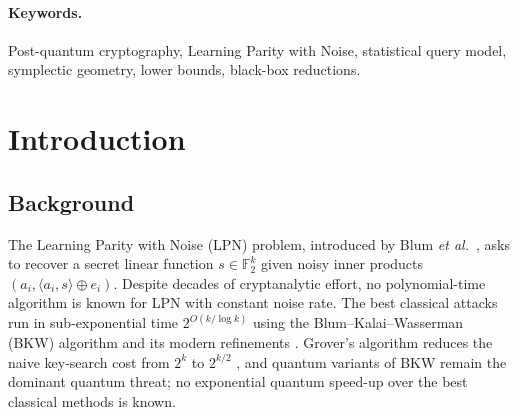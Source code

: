 \documentclass[11pt,a4paper]{article}
\theoremstyle{plain}
\theoremstyle{definition}
\newcommand{\F}{\mathbb{F}}
\newcommand{\etal}{\textit{et al.}}
\begin{document}
\begin{abstract}
For reductions, we introduce a \emph{transport} invariant $C^{\top}MC=0$ inherited from the secret's isotropy and combine it with an entropy-support counting bound to close three of the four cells of the linear-reduction landscape (public-matrix, fixed, conditionally-uniform adaptive) unconditionally, and the deterministic half of the fourth, leaving a single precisely-stated open cell (randomized marginal-adaptive). This is independent of, and complementary to, the concurrent decoding-formulation barriers of Lu \etal: our transport invariant and exact-moment analysis do not use their entropy argument. Our statistical-query and information-theoretic analysis works in the membership formulation --- its natural form --- while the linear-reduction landscape and the hardness floor above concern the computational sympLPN formulation; we separate the membership, batch, and sympLPN formulations by information-theoretic floors. While the LSN problem belongs to the recently proposed stabilizer-decoding / symplectic-LPN family rather than constituting a new hardness family of its own, the contributions developed here---the first exact, asymptotic-error-free statistical analysis of this problem class and a near-complete linear-reduction landscape---are new; every claim is a proved theorem, an explicitly labeled piece of empirical evidence, or an explicitly labeled conjecture.
\end{abstract}

\paragraph{\textbf{Keywords.}} Post-quantum cryptography, Learning Parity with Noise, statistical query model, symplectic geometry, lower bounds, black-box reductions.

\section{Introduction}
\label{sec:intro}

\subsection{Background}
\label{subsec:background}

The Learning Parity with Noise (LPN) problem, introduced by Blum \etal\ \cite{BFKL94}, asks to recover a secret linear function $s \in \F_2^k$ given noisy inner products $(a_i, \langle a_i, s \rangle \oplus e_i)$. Despite decades of cryptanalytic effort, no polynomial-time algorithm is known for LPN with constant noise rate. The best classical attacks run in sub-exponential time $2^{O(k / \log k)}$ using the Blum--Kalai--Wasserman (BKW) algorithm \cite{BKW03} and its modern refinements \cite{LF06,Lyu05,EKM17,GJL14,Kir11}. Grover's algorithm reduces the naive key-search cost from $2^k$ to $2^{k/2}$ \cite{Gro96}, and quantum variants of BKW remain the dominant quantum threat; no exponential quantum speed-up over the best classical methods is known.
\end{document}
